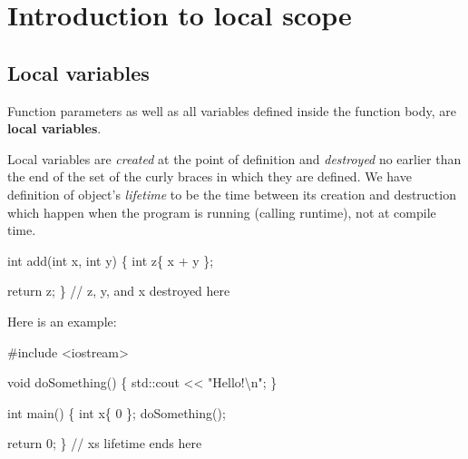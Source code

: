 \documentclass[
  letterpaper,
  DIV=11,
  numbers=noendperiod]{scrreprt}
\newenvironment{Shaded}{\begin{snugshade}}{\end{snugshade}}
\newcommand{\CommentTok}[1]{\textcolor[rgb]{0.37,0.37,0.37}{#1}}
\newcommand{\DecValTok}[1]{\textcolor[rgb]{0.68,0.00,0.00}{#1}}
\newcommand{\ErrorTok}[1]{\textcolor[rgb]{0.68,0.00,0.00}{#1}}
\newcommand{\FunctionTok}[1]{\textcolor[rgb]{0.28,0.35,0.67}{#1}}
\newcommand{\NormalTok}[1]{\textcolor[rgb]{0.00,0.23,0.31}{#1}}
\newcommand{\SpecialCharTok}[1]{\textcolor[rgb]{0.37,0.37,0.37}{#1}}
\newcommand{\StringTok}[1]{\textcolor[rgb]{0.13,0.47,0.30}{#1}}
\begin{document}
\hypertarget{sec-localScope}{%
\section{Introduction to local scope}\label{sec-localScope}}

\hypertarget{sec-localVariable}{%
\subsection{Local variables}\label{sec-localVariable}}

Function parameters as well as all variables defined inside the function
body, are \textbf{local variables}.

Local variables are \emph{created} at the point of definition and
\emph{destroyed} no earlier than the end of the set of the curly braces
in which they are defined. We have definition of object's
\emph{lifetime} to be the time between its creation and destruction
which happen when the program is running (calling runtime), not at
compile time.

\begin{Shaded}
\begin{Highlighting}[]
\NormalTok{int }\FunctionTok{add}\NormalTok{(int x, int y)}
\NormalTok{\{}
\NormalTok{    int z\{ x }\SpecialCharTok{+}\NormalTok{ y \};}

\NormalTok{    return z;}
\NormalTok{\} }\SpecialCharTok{/}\ErrorTok{/}\NormalTok{ z, y, and x destroyed here}
\end{Highlighting}
\end{Shaded}

Here is an example:

\begin{Shaded}
\begin{Highlighting}[]
\CommentTok{\#include \textless{}iostream\textgreater{}}

\NormalTok{void }\FunctionTok{doSomething}\NormalTok{()}
\NormalTok{\{}
\NormalTok{    std}\SpecialCharTok{::}\NormalTok{cout }\SpecialCharTok{\textless{}}\ErrorTok{\textless{}} \StringTok{"Hello!}\SpecialCharTok{\textbackslash{}n}\StringTok{"}\NormalTok{;}
\NormalTok{\}}

\NormalTok{int }\FunctionTok{main}\NormalTok{()}
\NormalTok{\{}
\NormalTok{    int x\{ }\DecValTok{0}\NormalTok{ \};}
    \FunctionTok{doSomething}\NormalTok{();}

\NormalTok{    return }\DecValTok{0}\NormalTok{;}
\NormalTok{\} }\SpecialCharTok{/}\ErrorTok{/}\NormalTok{ x}\StringTok{\textquotesingle{}s lifetime ends here}
\end{Highlighting}
\end{Shaded}
\end{document}
